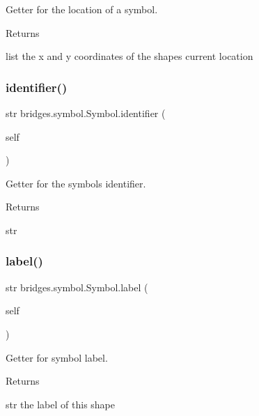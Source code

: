 Getter for the location of a symbol. 

\begin{DoxyReturn}{Returns}


list the x and y coordinates of the shape\textquotesingle{}s current location 
\end{DoxyReturn}
\mbox{\label{classbridges_1_1symbol_1_1_symbol_a84683c105c53b4a35e7444f7c2a6064d}} 
\subsubsection{\texorpdfstring{identifier()}{identifier()}}
{\footnotesize\ttfamily  str bridges.\+symbol.\+Symbol.\+identifier (\begin{DoxyParamCaption}\item[{}]{self }\end{DoxyParamCaption})}



Getter for the symbols identifier. 

\begin{DoxyReturn}{Returns}


str 
\end{DoxyReturn}
\mbox{\label{classbridges_1_1symbol_1_1_symbol_a94be85f7ec433b5ac577ca12753fa911}} 
\subsubsection{\texorpdfstring{label()}{label()}\hspace{0.1cm}{\footnotesize\ttfamily [1/2]}}
{\footnotesize\ttfamily  str bridges.\+symbol.\+Symbol.\+label (\begin{DoxyParamCaption}\item[{}]{self }\end{DoxyParamCaption})}



Getter for symbol label. 

\begin{DoxyReturn}{Returns}


str the label of this shape 
\end{DoxyReturn}
\mbox{\label{classbridges_1_1symbol_1_1_symbol_a615f9ccca959c3f4b528c75df96104d5}} 

